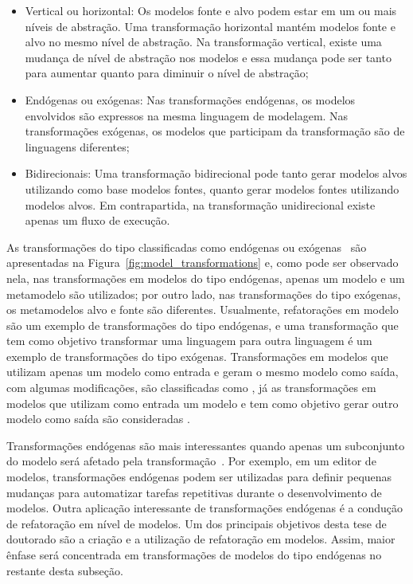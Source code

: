 \begin{itemize}
	\item Vertical ou horizontal: Os modelos fonte e alvo podem estar em um ou mais níveis de abstração. Uma transformação horizontal mantém modelos fonte e alvo no mesmo nível de abstração. Na transformação vertical, existe uma mudança de nível de abstração nos modelos e essa mudança pode ser tanto para aumentar quanto para diminuir o nível de abstração;
	\item  Endógenas ou exógenas: Nas transformações endógenas, os modelos envolvidos são expressos na mesma linguagem de modelagem. Nas transformações exógenas, os modelos que participam da transformação são de linguagens diferentes;
	\item Bidirecionais: Uma transformação bidirecional pode tanto gerar modelos alvos utilizando como base modelos fontes, quanto gerar modelos fontes utilizando modelos alvos. Em contrapartida, na transformação unidirecional existe apenas um fluxo de execução. 
\end{itemize}

As transformações do tipo classificadas como endógenas ou exógenas~\cite{Brambilla_2012} são apresentadas na Figura~\ref{fig:model_transformations} e, como pode ser observado nela, nas transformações em modelos do tipo endógenas, apenas um modelo e um metamodelo são utilizados; por outro lado, nas transformações do tipo exógenas, os metamodelos alvo e fonte são diferentes. Usualmente, refatorações em modelo são um exemplo de transformações do tipo endógenas, e uma transformação que tem como objetivo transformar uma linguagem para outra linguagem é um exemplo de transformações do tipo exógenas. Transformações em modelos que utilizam apenas um modelo como entrada e geram o mesmo modelo como saída, com algumas modificações, são classificadas como , já as transformações em modelos que utilizam como entrada um modelo e tem como objetivo gerar outro modelo como saída são consideradas . 

Transformações endógenas são mais interessantes quando apenas um subconjunto do modelo será afetado pela transformação~\cite{Brambilla_2012}. Por exemplo, em um editor de modelos, transformações endógenas podem ser utilizadas para definir pequenas mudanças para automatizar tarefas repetitivas durante o desenvolvimento de modelos. Outra aplicação interessante de transformações endógenas é a condução de refatoração em nível de modelos. Um dos principais objetivos desta tese de doutorado são a criação e a utilização de refatoração em modelos. Assim, maior ênfase será concentrada em transformações de modelos do tipo endógenas no restante desta subseção.


